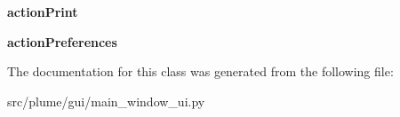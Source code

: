 \begin{DoxyCompactItemize}
\item 
{\bfseries action\+Print}\hypertarget{classplume-creator_1_1src_1_1plume_1_1gui_1_1main__window__ui_1_1_ui___main_window_abb3bf7f1f37e686dcc36616128b7b6aa}{}\label{classplume-creator_1_1src_1_1plume_1_1gui_1_1main__window__ui_1_1_ui___main_window_abb3bf7f1f37e686dcc36616128b7b6aa}

\item 
{\bfseries action\+Preferences}\hypertarget{classplume-creator_1_1src_1_1plume_1_1gui_1_1main__window__ui_1_1_ui___main_window_a21106eadb79fbf56dcb37e24d7745514}{}\label{classplume-creator_1_1src_1_1plume_1_1gui_1_1main__window__ui_1_1_ui___main_window_a21106eadb79fbf56dcb37e24d7745514}

\end{DoxyCompactItemize}


The documentation for this class was generated from the following file\+:\begin{DoxyCompactItemize}
\item 
src/plume/gui/main\+\_\+window\+\_\+ui.\+py\end{DoxyCompactItemize}
